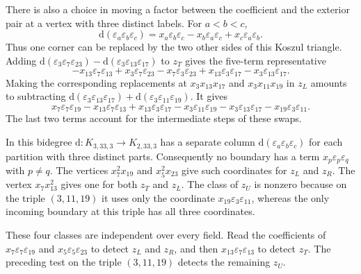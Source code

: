 \begin{example}
There is also a choice in moving a factor between the coefficient and the
exterior pair at a vertex with three distinct labels. For $a<b<c$,
\[
 \mathrm{d}(\varepsilon_a\varepsilon_b\varepsilon_c)
     =x_a\varepsilon_b\varepsilon_c-x_b\varepsilon_a\varepsilon_c+x_c\varepsilon_a\varepsilon_b.
\]
Thus one corner can be replaced by the two other sides of this
Koszul triangle.
Adding $\mathrm{d}(\varepsilon_3\varepsilon_7\varepsilon_{23})-\mathrm{d}(\varepsilon_3\varepsilon_{13}\varepsilon_{17})$ to $z_T$ gives the five-term representative
\[
 -x_{13}\varepsilon_7\varepsilon_{13}+x_3\varepsilon_7\varepsilon_{23}-x_7\varepsilon_3\varepsilon_{23}+x_{13}\varepsilon_3\varepsilon_{17}-x_3\varepsilon_{13}\varepsilon_{17}.
\]
Making the corresponding replacements at $x_3x_{13}x_{17}$ and
$x_3x_{11}x_{19}$ in $z_L$ amounts to subtracting
$\mathrm{d}(\varepsilon_3\varepsilon_{13}\varepsilon_{17})+\mathrm{d}(\varepsilon_3\varepsilon_{11}\varepsilon_{19})$. It gives
\[
 x_7\varepsilon_7\varepsilon_{19}-x_{13}\varepsilon_7\varepsilon_{13}+x_{13}\varepsilon_3\varepsilon_{17}-x_3\varepsilon_{11}\varepsilon_{19}
       -x_3\varepsilon_{13}\varepsilon_{17}-x_{19}\varepsilon_3\varepsilon_{11}.
\]
The last two terms account for the intermediate steps of these swaps.

In this bidegree $\mathrm{d}:K_{3,33,3}\to K_{2,33,3}$ has a separate column $\mathrm{d}(\varepsilon_a\varepsilon_b\varepsilon_c)$ for each
partition with three distinct parts. Consequently no boundary has a term
$x_p\varepsilon_p\varepsilon_q$ with $p\ne q$. The vertices $x_7^2x_{19}$ and $x_5^2x_{23}$
give such coordinates for $z_L$ and $z_R$. The vertex $x_7x_{13}^2$
gives one for both $z_T$ and $z_L$. The class of $z_U$ is nonzero
because on the triple $(3,11,19)$ it uses only the coordinate
$x_{19}\varepsilon_3\varepsilon_{11}$, whereas the only incoming
boundary at this triple has all three coordinates.

These four classes are independent over every field. Read the
coefficients of $x_7\varepsilon_7\varepsilon_{19}$ and $x_5\varepsilon_5\varepsilon_{23}$ to detect $z_L$ and $z_R$,
and then $x_{13}\varepsilon_7\varepsilon_{13}$ to detect $z_T$. The preceding test on the
triple $(3,11,19)$ detects the remaining $z_U$.
\end{example}

